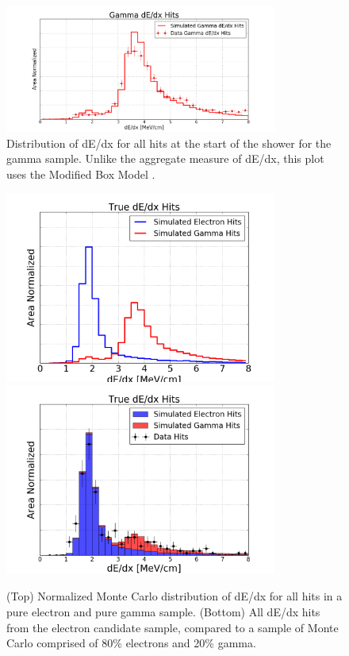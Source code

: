 \begin{figure}[p]
  \centering
  \includegraphics[width=0.8\textwidth]{emshower_figures/photons_landau.png}
  \caption[Photon Landau Distribution]{Distribution of dE/dx for all hits at the start of the shower for the gamma sample.  Unlike the aggregate measure of dE/dx, this plot uses the Modified Box Model \cite{Acciarri:2013met}.}
  \label{fig:photon_landau}
 \end{figure} 

\begin{figure}[p]
  \centering
   
  \includegraphics[width=0.8\textwidth]{emshower_figures/mcLandaus.png}
  \includegraphics[width=0.8\textwidth]{emshower_figures/fitted_electron_distribution.png}
  \caption[Estimate of Photon Contamination in Electron Sample]{(Top) Normalized Monte Carlo distribution of dE/dx for all hits in a pure electron and pure gamma sample.  (Bottom) All dE/dx hits from the electron candidate sample, compared to a sample of Monte Carlo comprised of 80\% electrons and 20\% gamma.}
  \label{fig:electron_landau}
\end{figure} 




